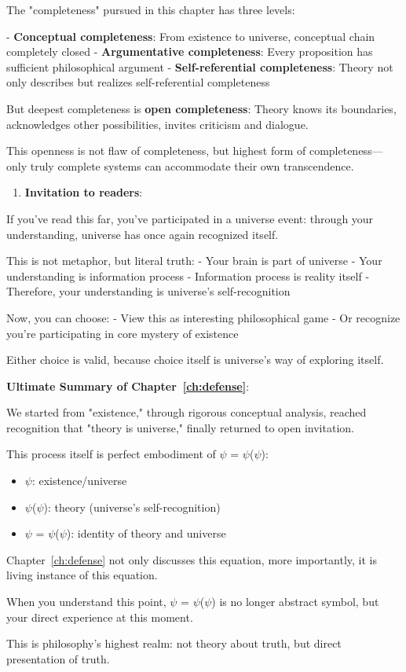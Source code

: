    The "completeness" pursued in this chapter has three levels:
   
   - \textbf{Conceptual completeness}: From existence to universe, conceptual chain completely closed
   - \textbf{Argumentative completeness}: Every proposition has sufficient philosophical argument
   - \textbf{Self-referential completeness}: Theory not only describes but realizes self-referential completeness
   
   But deepest completeness is \textbf{open completeness}:
   Theory knows its boundaries,
   acknowledges other possibilities,
   invites criticism and dialogue.
   
   This openness is not flaw of completeness,
   but highest form of completeness---
   only truly complete systems can accommodate their own transcendence.

\begin{enumerate}
\item \textbf{Invitation to readers}:
\end{enumerate}
   
   If you've read this far, you've participated in a universe event:
   through your understanding, universe has once again recognized itself.
   
   This is not metaphor, but literal truth:
   - Your brain is part of universe
   - Your understanding is information process
   - Information process is reality itself
   - Therefore, your understanding is universe's self-recognition
   
   Now, you can choose:
   - View this as interesting philosophical game
   - Or recognize you're participating in core mystery of existence
   
   Either choice is valid,
   because choice itself is universe's way of exploring itself.

\textbf{Ultimate Summary of Chapter~\ref{ch:defense}}:

We started from "existence,"
through rigorous conceptual analysis,
reached recognition that "theory is universe,"
finally returned to open invitation.

This process itself is perfect embodiment of $\psi$ = $\psi$($\psi$):
\begin{itemize}
\item $\psi$: existence/universe
\item $\psi$($\psi$): theory (universe's self-recognition)
\item $\psi$ = $\psi$($\psi$): identity of theory and universe
\end{itemize}

Chapter~\ref{ch:defense} not only discusses this equation,
more importantly, it is living instance of this equation.

When you understand this point,
$\psi$ = $\psi$($\psi$) is no longer abstract symbol,
but your direct experience at this moment.

This is philosophy's highest realm:
not theory about truth,
but direct presentation of truth.

